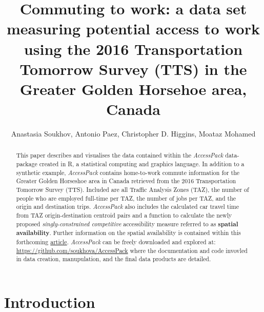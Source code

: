 \documentclass[Royal,times,sageh]{sagej}
\begin{document}

\title{Commuting to work: a data set measuring potential access to work
using the 2016 Transportation Tomorrow Survey (TTS) in the Greater
Golden Horsehoe area, Canada}

\runninghead{}

\author{Anastasia Soukhov\affilnum{}, Antonio
Paez\affilnum{}, Christopher D. Higgins\affilnum{}, Moataz
Mohamed\affilnum{}}

\affiliation{\affilnum{}{}\\\affilnum{}{}\\\affilnum{}{}}



\begin{abstract}
This paper describes and visualises the data contained within the
\emph{AccessPack} data-package created in R, a statistical computing and
graphics language. In addition to a synthetic example, \emph{AccessPack}
contains home-to-work commute information for the Greater Golden
Horseshoe area in Canada retrieved from the 2016 Transportation Tomorrow
Survey (TTS). Included are all Traffic Analysis Zones (TAZ), the number
of people who are employed full-time per TAZ, the number of jobs per
TAZ, and the origin and destination trips. \emph{AccessPack} also
includes the calculated car travel time from TAZ origin-destination
centroid pairs and a function to calculate the newly proposed
\emph{singly-constrained competitive} accessibility measure referred to
as \textbf{spatial availability}. Further information on the spatial
availability is contained within this forthcoming
\href{https://github.com/soukhova/Spatial-Availability-Measure}{article}.
\emph{AccessPack} can be freely downloaded and explored at:
\url{https://github.com/soukhova/AccessPack} where the documentation and
code invovled in data creation, manupulation, and the final data
products are detailed.
\end{abstract}


\maketitle

\hypertarget{introduction}{%
\section{Introduction}\label{introduction}}
\end{document}
